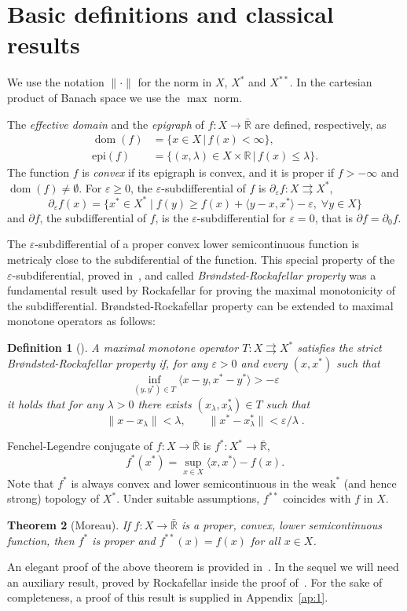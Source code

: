 \documentclass[11pt]{article}
\newcommand{\R}{\mathbb{R}}
\newcommand{\BR}{\bar{\mathbb{R}}}
\DeclareMathOperator{\ed}{dom}
\newcommand{\inner}[2]{\langle{#1},{#2}\rangle}
\newcommand{\norm}[1]{\|#1\|}
\newcommand{\tos}{\rightrightarrows} %
\newtheorem{theorem}{Theorem}[section]
\newtheorem{definition}[theorem]{Definition}
\begin{document}
\section{Basic definitions and classical results}
\label{sec:bd}
We use the notation $\norm{\cdot}$ for the norm in $X$, $X^{*}$ and $X^{**}$. 
%
In the cartesian product of Banach space we use the $\max$ norm.


The {\it effective domain} and the {\it epigraph} of $f:X\to \BR$ are defined,
respectively, as
%
\begin{align*}
 \ed(f)&=\{x\in X\,|\,f(x)<\infty\},\\
 \mbox{epi}(f)&=\{(x,\lambda)\in X\times \R\,|\,f(x)\leq \lambda\}.
\end{align*}
The function $f$ is \emph{convex} if its epigraph is convex, and it is proper
if $f>-\infty$ and $\ed(f)\neq\emptyset$.
%
For $\varepsilon\geq 0$, the $\varepsilon$-subdifferential of $f$ is
$\partial_\varepsilon f:X\tos X^*$,
\[
\partial_\varepsilon f(x)=\{ x^*\in X^*\;|\; f(y)\geq
f(x)+\inner{y-x}{x^*}-\varepsilon,\; \forall y\in X\}
\]  
and $\partial f$, the subdifferential of $f$, is the
$\varepsilon$-subdifferential for $\varepsilon=0$, that is $\partial f
=\partial_0 f$.

The $\varepsilon$-subdifferential of a proper convex
lower semicontinuous function is metricaly close to the subdiferential
of the function. This special property of the
$\varepsilon$-subdiferential, proved in~\cite{bro.roc-sub.pams65}, and called
\emph{Br\o ndsted-Rockafellar property} was a fundamental result used by
Rockafellar for proving the maximal monotonicity of the
subdifferential.
%
Br\o ndsted-Rockafellar property can be extended to maximal monotone
operators as follows:
%
\begin{definition}[\mbox{\cite{alv.sva-bro.jca08}}]
  A maximal monotone operator $T:X\tos X^*$ satisfies the \emph{strict
  Br\o ndsted-Rockafellar property} if, for any $\varepsilon>0$ and
  every $(x,x^*)$ such that
  \[ \inf_{(y,y^*)\in T} \inner{x-y}{x^*-y^*}> -\varepsilon 
  \]
  it holds that for any $\lambda>0$ there exists
  $(x_\lambda,x_\lambda^*)\in T$ such that
  \[ \norm{x-x_\lambda}<\lambda,\qquad
  \norm{x^*-x^*_\lambda}<\varepsilon/\lambda\;.
  \]
\end{definition}


Fenchel-Legendre conjugate of $f:X\to\BR$ is $f^*:X^*\to\BR$,
\[
f^*(x^*)=\sup_{x\in X}\inner{x}{x^*}-f(x).
\] 
Note that $f^*$ is always convex and lower semicontinuous in the
$\mbox{weak}^*$ (and hence strong) topology of $X^*$.
%
Under suitable assumptions, $f^{**}$ coincides with $f$ in $X$.
\begin{theorem}[Moreau]\label{th:mr}
  If $f:X\to\BR$ is a proper, convex, lower semicontinuous function, then
  $f^*$ is proper and $f^{**}(x)=f(x)$ for all $x\in X$.
\end{theorem}
An elegant proof of the above theorem is provided in~\cite{brezis}.
%
In the sequel we will need an auxiliary result, proved by Rockafellar inside the
proof of~\cite[Proposition 1]{roc-max.pjm70}.  For the sake of completeness, a proof
of this result is supplied in Appendix~\ref{ap:1}.
%
\end{document}
